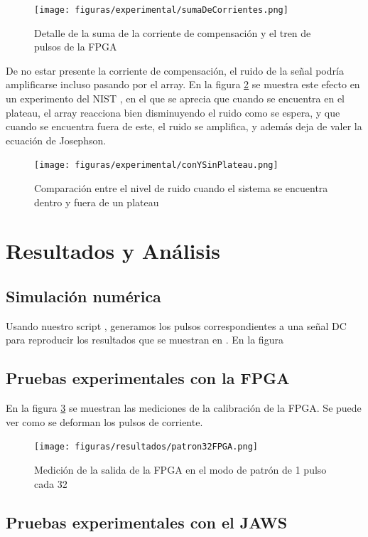 \documentclass[twoside]{article}
\begin{document}
\begin{multicols}{2}
\begin{figure}[H]
    \centering
    \texttt{[image: figuras/experimental/sumaDeCorrientes.png]}
    \caption{Detalle de la suma de la corriente de compensación y el tren de pulsos de la FPGA}
    \label{fig:experimental_sumaDeCorrientes}
\end{figure}

De no estar presente la corriente de compensación, el ruido de la señal podría amplificarse incluso pasando por el array. En la figura \ref{fig:experimental_conYSinPlateau} se muestra este efecto en un experimento del NIST \cite{quantumLockingRangesNIST}, en el que se aprecia que cuando se encuentra en el plateau, el array reacciona bien disminuyendo el ruido como se espera, y que cuando se encuentra fuera de este, el ruido se amplifica, y además deja de valer la ecuación de Josephson.

\begin{figure}[H]
    \centering
    \texttt{[image: figuras/experimental/conYSinPlateau.png]}
    \caption{Comparación entre el nivel de ruido cuando el sistema se encuentra dentro y fuera de un plateau}
    \label{fig:experimental_conYSinPlateau}
\end{figure}

\section{Resultados y Análisis}

    \subsection{Simulación numérica}

    Usando nuestro script \cite{script}, generamos los pulsos correspondientes a una señal DC para reproducir los resultados que se muestran en \cite{aziz1996}. En la figura 

    \subsection{Pruebas experimentales con la FPGA}

    En la figura \ref{fig:resultados_patron32FPGA} se muestran las mediciones de la calibración de la FPGA. Se puede ver como se deforman los pulsos de corriente.

    \begin{figure}[H]
        \centering
        \texttt{[image: figuras/resultados/patron32FPGA.png]}
        \caption{Medición de la salida de la FPGA en el modo de patrón de 1 pulso cada 32}
        \label{fig:resultados_patron32FPGA}
    \end{figure}

    \subsection{Pruebas experimentales con el JAWS}

    

\end{multicols}





\nocite{*} %
\end{document}
